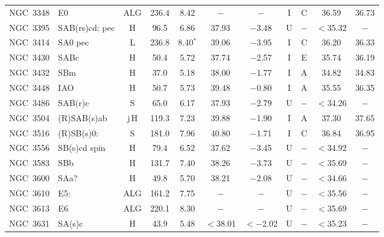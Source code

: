 \begin{center}
\begin{longtable}{lC{2.5cm}ccccccccc}
NGC~3348 & E0                 & ALG             & 236.4 & 8.42              & $-$      & $-$       &    I   & C        & 36.59    & 36.73    \\
NGC~3395 & SAB(rs)cd: pec  & H               & 96.5  & 6.86             & 37.93   & $-$3.48 &    U   &$-$       & $<$35.32  &  $-$     \\
NGC~3414  & SA0 pec         & L                &  236.8   &  8.40$^{*}$ &  39.06   &  $-$3.95  &  I   & C    &  36.20    &  36.33  \\
NGC~3430  & SABc              & H                &  50.4    &   5.72        &   37.74   & $-$2.57  &  I  & E      &   35.74   &  36.19  \\
NGC~3432  & SBm              &   H               &  37.0       &  5.18        &  38.00    &  $-$1.77   & I  & A    &  34.82   &  34.83   \\
NGC~3448 & IAO             & H               & 50.7  & 5.73              & 39.48    & $-$0.80  &    I   & A        & 35.55    & 36.35       \\
NGC~3486 & SAB(r)c        & S               & 65.0    & 6.17             & 37.93    & $-$2.79   &    U   &$-$       & $<$34.26 & $-$       \\
NGC~3504 & (R)SAB(s)ab  & j\,H               & 119.3 & 7.23             & 39.88    & $-$1.90   &    I   & A        & 37.30    & 37.65    \\
NGC~3516 & (R)SB(s)0:     & S               & 181.0   & 7.96             & 40.80    & $-$1.71  &    I   & C        & 36.84    & 36.95    \\
NGC~3556 & SB(s)cd spin  &  H              & 79.4  & 6.52             & 37.62    & $-$3.45   &    U   &$-$       & $<$34.92 & $-$       \\
NGC~3583  & SBb             &  H               &  131.7   & 7.40        &   38.26  &  $-$3.73    &   U &   $-$      &   $<$35.69  &  $-$ \\
NGC~3600  &  SAa?          &  H               &    49.8   &  5.70        &   38.21  &  $-$2.08    &  U  &   $-$      & $<$34.66 & $-$  \\
NGC~3610 & E5:              & ALG             & 161.2 & 7.75             & $-$      & $-$      &    U   &$-$       & $<$35.56 & $-$       \\
NGC~3613  & E6              & ALG             & 220.1 & 8.30             & $-$      & $-$      &    U   &$-$       & $<$35.69 & $-$       \\
NGC~3631 & SA(s)c          & H               & 43.9  & 5.48             & $<$38.01    & $<-$2.02  &    U   &$-$       & $<$35.23 & $-$       \\

\end{longtable}
\end{center}
